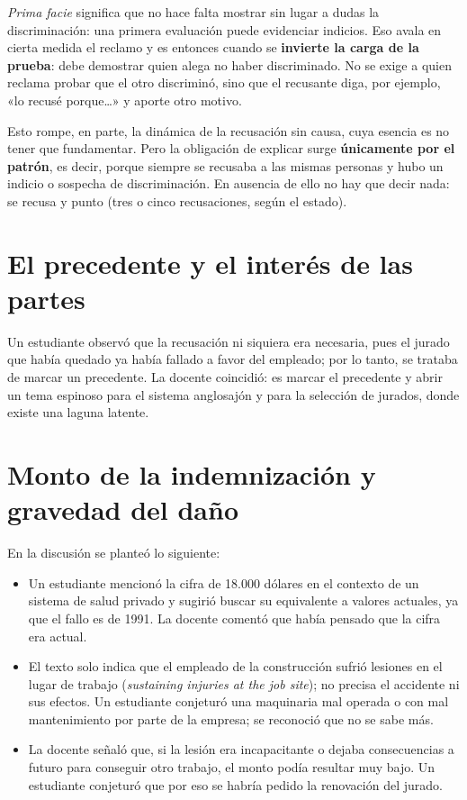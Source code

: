 \documentclass[12pt,oneside]{book}
\begin{document}
\textit{Prima facie} significa que no hace falta mostrar sin lugar a dudas la discriminación: una primera evaluación puede evidenciar indicios. Eso avala en cierta medida el reclamo y es entonces cuando se \textbf{invierte la carga de la prueba}: debe demostrar quien alega no haber discriminado. No se exige a quien reclama probar que el otro discriminó, sino que el recusante diga, por ejemplo, «lo recusé porque\ldots» y aporte otro motivo.

Esto rompe, en parte, la dinámica de la recusación sin causa, cuya esencia es no tener que fundamentar. Pero la obligación de explicar surge \textbf{únicamente por el patrón}, es decir, porque siempre se recusaba a las mismas personas y hubo un indicio o sospecha de discriminación. En ausencia de ello no hay que decir nada: se recusa y punto (tres o cinco recusaciones, según el estado).

\section{El precedente y el interés de las partes}

Un estudiante observó que la recusación ni siquiera era necesaria, pues el jurado que había quedado ya había fallado a favor del empleado; por lo tanto, se trataba de marcar un precedente. La docente coincidió: es marcar el precedente y abrir un tema espinoso para el sistema anglosajón y para la selección de jurados, donde existe una laguna latente.

\section{Monto de la indemnización y gravedad del daño}

En la discusión se planteó lo siguiente:

\begin{itemize}
    \item Un estudiante mencionó la cifra de 18.000 dólares en el contexto de un sistema de salud privado y sugirió buscar su equivalente a valores actuales, ya que el fallo es de 1991. La docente comentó que había pensado que la cifra era actual.
    \item El texto solo indica que el empleado de la construcción sufrió lesiones en el lugar de trabajo (\textit{sustaining injuries at the job site}); no precisa el accidente ni sus efectos. Un estudiante conjeturó una maquinaria mal operada o con mal mantenimiento por parte de la empresa; se reconoció que no se sabe más.
    \item La docente señaló que, si la lesión era incapacitante o dejaba consecuencias a futuro para conseguir otro trabajo, el monto podía resultar muy bajo. Un estudiante conjeturó que por eso se habría pedido la renovación del jurado.
\end{itemize}
\end{document}

